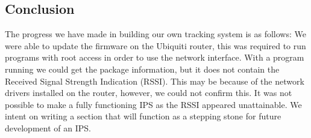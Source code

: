 \subsection*{Conclusion}
The progress we have made in building our own tracking system is as follows: We were able to update the firmware on the Ubiquiti router, this was required to run programs with root access in order to use the network interface. With a program running we could get the package information, but it does not contain the Received Signal Strength Indication (RSSI). This may be because of the network drivers installed on the router, however, we could not confirm this. It was not possible to make a fully functioning IPS as the RSSI appeared unattainable. We intent on writing a section that will function as a stepping stone for future development of an IPS. 